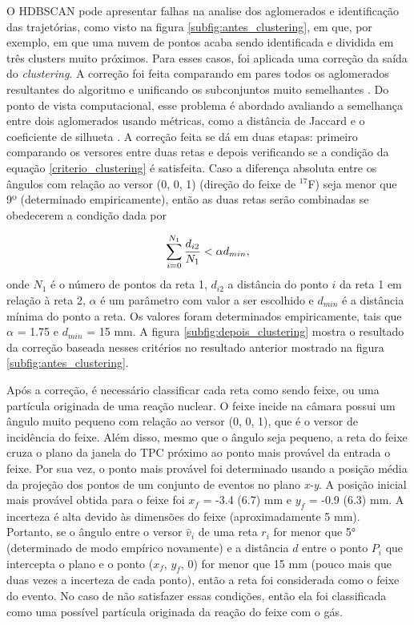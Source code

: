 \documentclass[a4paper,12pt,oneside]{book}
\begin{document}
\par O \textsc{HDBSCAN} pode apresentar falhas na analise dos aglomerados e identificação das trajetórias, como visto na figura \ref{subfig:antes_clustering}, em que, por exemplo, em que uma nuvem de pontos acaba sendo identificada e dividida em três clusters muito próximos. Para esses casos, foi aplicada uma correção da saída do \textit{clustering}. A correção foi feita comparando em pares todos os aglomerados resultantes do algoritmo e unificando os subconjuntos muito semelhantes \cite{artigo}. Do ponto de vista computacional, esse problema é abordado avaliando a semelhança entre dois aglomerados usando métricas, como a distância de Jaccard \cite{jaccard_distance} e o coeficiente de silhueta \cite{silhueta}. A correção feita se dá em duas etapas: primeiro comparando os versores entre duas retas e depois verificando se a condição da equação \ref{criterio_clustering} é satisfeita. Caso a diferença absoluta entre os ângulos com relação ao versor (0, 0, 1) (direção do feixe de $^{17}$F) seja menor que 9º (determinado empiricamente), então as duas retas serão combinadas se obedecerem a condição dada por

\begin{equation}\label{criterio_clustering}
    \sum_{i = 0}^{N_1}\frac{d_{i2}}{N_1} < \alpha \space d_{min}, 
\end{equation}
%
onde $N_1$ é o número de pontos da reta 1, $d_{i2}$ a distância do ponto $i$ da reta 1 em relação à reta 2, $\alpha$ é um parâmetro com valor a ser escolhido e $d_{min}$ é a distância mínima do ponto a reta. Os valores foram determinados empiricamente, tais que $\alpha$ = 1.75 e $d_{min}$ = 15 mm. A figura \ref{subfig:depois_clustering} mostra o resultado da correção baseada nesses critérios no resultado anterior mostrado na figura \ref{subfig:antes_clustering}.

\par Após a correção, é necessário classificar cada reta como sendo feixe, ou uma partícula originada de uma reação nuclear. O feixe incide na câmara possui um ângulo muito pequeno com relação ao versor (0, 0, 1), que é o versor de incidência do feixe. Além disso, mesmo que o ângulo seja pequeno, a reta do feixe cruza o plano da janela do TPC próximo ao ponto mais provável da entrada o feixe. Por sua vez, o ponto mais provável foi determinado usando a posição média da projeção dos pontos de um conjunto de eventos no plano \textit{x-y}. A posição inicial mais provável obtida para o feixe foi $x_f$ = -3.4 (6.7) mm e $y_f$ = -0.9 (6.3) mm. A incerteza é alta devido às dimensões do feixe (aproximadamente 5 mm). Portanto, se o ângulo entre o versor $\hat{v}_i$ de uma reta $r_i$ for menor que 5° (determinado de modo empírico novamente) e a distância $d$ entre o ponto $P_i$ que intercepta o plano e o ponto ($x_f$, $y_f$, 0) for menor que 15 mm (pouco mais que duas vezes a incerteza de cada ponto), então a reta foi considerada como o feixe do evento. No caso de não satisfazer essas condições, então ela foi classificada como uma possível partícula originada da reação do feixe com o gás.
\end{document}
